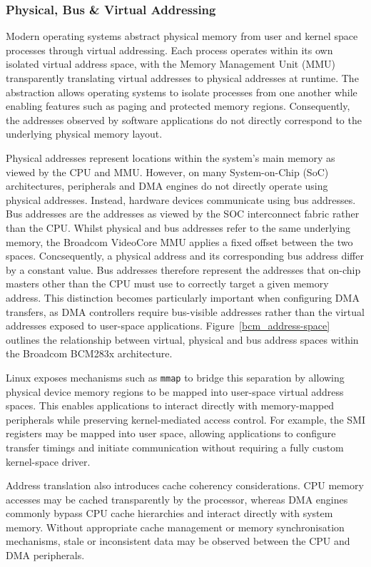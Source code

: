 \documentclass[final]{cmpreport}
\begin{document}
\subsubsection{Physical, Bus \& Virtual Addressing}
Modern operating systems abstract physical memory from user and kernel space processes through virtual addressing. Each process operates within its own isolated virtual address space, with the Memory Management Unit (MMU) transparently translating virtual addresses to physical addresses at runtime. The abstraction allows operating systems to isolate processes from one another while enabling features such as paging and protected memory regions. Consequently, the addresses observed by software applications do not directly correspond to the underlying physical memory layout.

Physical addresses represent locations within the system's main memory as viewed by the CPU and MMU. However, on many System-on-Chip (SoC) architectures, peripherals and DMA engines do not directly operate using physical addresses. Instead, hardware devices communicate using bus addresses. Bus addresses are the addresses as viewed by the SOC interconnect fabric rather than the CPU. Whilst physical and bus addresses refer to the same underlying memory, the Broadcom VideoCore MMU applies a fixed offset between the two spaces. Concsequently, a physical address and its corresponding bus address differ by a constant value. Bus addresses therefore represent the addresses that on-chip masters other than the CPU must use to correctly target a given memory address. This distinction becomes particularly important when configuring DMA transfers, as DMA controllers require bus-visible addresses rather than the virtual addresses exposed to user-space applications. Figure~\ref{bcm_address-space} outlines the relationship between virtual, physical and bus address spaces within the Broadcom BCM283x architecture.

Linux exposes mechanisms such as \texttt{mmap} to bridge this separation by allowing physical device memory regions to be mapped into user-space virtual address spaces. This enables applications to interact directly with memory-mapped peripherals while preserving kernel-mediated access control. For example, the SMI registers may be mapped into user space, allowing applications to configure transfer timings and initiate communication without requiring a fully custom kernel-space driver.

Address translation also introduces cache coherency considerations. CPU memory accesses may be cached transparently by the processor, whereas DMA engines commonly bypass CPU cache hierarchies and interact directly with system memory. Without appropriate cache management or memory synchronisation mechanisms, stale or inconsistent data may be observed between the CPU and DMA peripherals.
\end{document}
